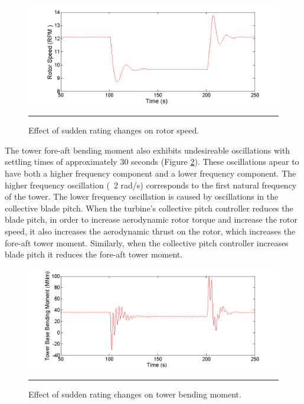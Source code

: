 \begin{figure}[htbp]
	\centering
		\includegraphics[trim = {1cm 0 2cm 0}, clip, width = \linewidth]{Figures/ch4Figures/fig4-10.png}
		\rule{35em}{0.5pt}
	\caption{Effect of sudden rating changes on rotor speed.}
	\label{fig4-10}
\end{figure}

The tower fore-aft bending moment also exhibits undesireable oscillations with settling times of approximately 30 seconds (Figure \ref{fig4-11}). These oscillations apear to have both a higher frequency component and a lower frequency component. The higher frequency oscillation (~2 rad/s) corresponds to the first natural frequency of the tower. The lower frequency oscillation is caused by oscillations in the collective blade pitch. When the turbine's collective pitch controller reduces the blade pitch, in order to increase aerodynamic rotor torque and increase the rotor speed, it also increases the aerodynamic thrust on the rotor, which increases the fore-aft tower moment. Similarly, when the collective pitch controller increases blade pitch it reduces the fore-aft tower moment. 

\begin{figure}[htbp]
	\centering
		\includegraphics[trim = {1cm 0 2cm 0}, clip, width = \linewidth]{Figures/ch4Figures/fig4-11.png}
		\rule{35em}{0.5pt}
	\caption{Effect of sudden rating changes on tower bending moment.}
	\label{fig4-11}
\end{figure}

